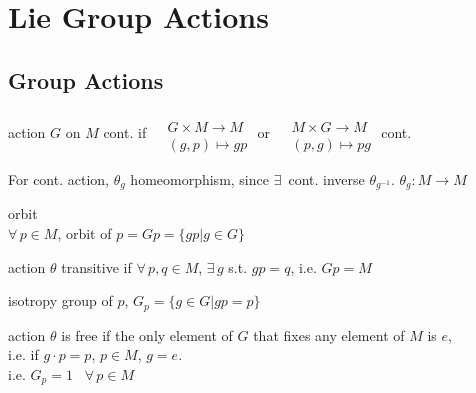 \section{Lie Group Actions}

\subsection{ Group Actions }

action $G$ on $M$ cont. if $\begin{aligned} & \quad \\ & G \times M \to M \\ & (g,p) \mapsto gp \end{aligned}$ or $\begin{aligned} & \quad \\ & M \times G \to M \\ & (p,g) \mapsto pg \end{aligned}$ cont.  

For cont. action, $\theta_g$ homeomorphism, since $\exists \, $ cont. inverse $\theta_{g^{-1}}$.  $\theta_g : M \to M$

orbit \\
$\forall \, p \in M$, orbit of $p = Gp = \lbrace gp | g \in G \rbrace$ 

action $\theta$ transitive if $\forall \, p, q \in M$, $\exists \, g$ s.t. $gp = q$, i.e. $Gp = M$

isotropy group of $p$, $G_p = \lbrace g \in G | gp = p \rbrace$ 

action $\theta$ is free if the only element of $G$ that fixes any element of $M$ is $e$, \\
i.e. if $g \cdot p = p$, $ p \in M$, $g=e$.  \\ 
i.e. $G_p = 1$ \, $\forall \, p \in M$

